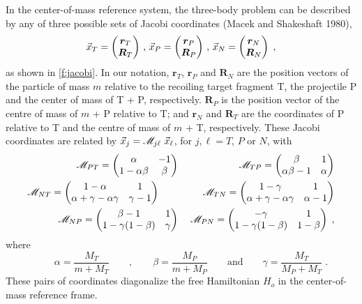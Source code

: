 In the center-of-mass reference system, the three-body problem can be described by any of three possible sets of Jacobi coordinates (Macek and Shakeshaft 1980),
\[
\vec{x}_T = \left( \begin{matrix} \bm{r}_T \cr \bm{R}_T \cr
  \end{matrix}
\right) \, , \, \vec{x}_P = \left( \begin{matrix} \bm{r}_P \cr \bm{R}_P \cr
  \end{matrix}
\right) \, , \, \vec{x}_N = \left( \begin{matrix} \bm{r}_N \cr \bm{R}_N \cr
  \end{matrix}
\right) \; ,
\]
as shown in \ref{f:jacobi}. In our notation, $\bm{r}_T$, $\bm{r}_P$ and $\bm{R}_N$ are the position vectors of the particle of mass $m$ relative to the recoiling target fragment T, the projectile P and the center of mass of T + P, respectively. $\bm{R}_P$ is the position vector of the centre of mass of $m$ + P relative to T; and $\bm{r}_N$ and $\bm{R}_T$ are the coordinates of P relative to T and the centre of mass of $m$ + T, respectively. These Jacobi coordinates are related by $\vec{x}_j = {\cal M}_{j \ell}\ \vec{x}_\ell$, for $j , \ell = T$, $P$ or $N$, with
\begin{eqnarray*} {\cal M}_{PT} = \left(\begin{matrix}\alpha & -1 \cr 1- \alpha \beta & \beta \cr
    \end{matrix}
  \right) & & \; {\cal
    M}_{TP} = \left( \begin{matrix} \beta & 1 \cr \alpha \beta - 1 & \alpha \cr 
    \end{matrix}
  \right) \\  {\cal
    M}_{NT} = \left(\begin{matrix} 1 - \alpha & 1 \cr \alpha + \gamma - \alpha \gamma & \gamma - 1 \cr
    \end{matrix}
  \right) \qquad & & \; {\cal M}_{TN} = \left(\begin{matrix}1 - \gamma & 1 \cr \alpha + \gamma - \alpha
      \gamma & \alpha - 1 \cr 
    \end{matrix}
  \right) \\  {\cal M}_{NP} = \left( \begin{matrix} \beta - 1 & 1 \cr 1-
      \gamma (1- \beta) & \gamma \cr 
    \end{matrix}
  \right) & & \; {\cal M}_{PN} = \left( \begin{matrix} -\gamma & 1 \cr 1
      - \gamma (1- \beta) & 1 - \beta \cr 
    \end{matrix}
  \right) \; ,
\end{eqnarray*}
where
\[
\qquad \alpha= \frac{M_T}{m + M_T} \qquad , \qquad \beta=\frac{M_P}{m + M_P} \qquad \mbox{and} \qquad \gamma = \frac{M_T}{M_P + M_T} \; .
\]
These pairs of coordinates diagonalize the free Hamiltonian $H_o$ in the center-of-mass reference frame.

